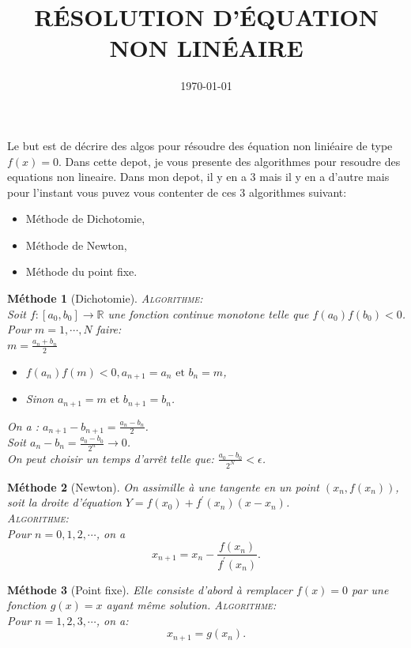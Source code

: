 \documentclass[a4paper,12pt]{article}
\date{\today}
\author{}
\title{RÉSOLUTION D'ÉQUATION NON LINÉAIRE}
\theoremstyle{break}
\newtheorem{meth}{Méthode}
\begin{document}
\maketitle

Le but est de décrire des algos pour résoudre des équation non liniéaire de type $f(x)=0$.
Dans cette depot, je vous presente des algorithmes pour resoudre des equations non lineaire.
Dans mon depot, il y en a 3 mais il y en a d'autre mais pour l'instant vous puvez vous contenter de ces 3 algorithmes suivant:
\begin{itemize}
    \item Méthode de Dichotomie,
    \item Méthode de Newton,
    \item Méthode du point fixe.
\end{itemize}

\begin{meth}[Dichotomie]
    \textsc{Algorithme:} \\
        Soit $f : [a_{0}, b_{0}] \rightarrow \mathbb{R}$ une fonction continue monotone telle que $f(a_{0})f(b_{0}) < 0$. \\
        Pour $m = 1, \cdots, N$ faire: \\ $m = \frac{a_{n} + b_{n}}{2}$
        \begin{itemize}
            \item $f(a_{n})f(m)<0, a_{n+1} = a_{n} \mbox{ et } b_{n} = m$,
            \item Sinon $a_{n+1} = m \mbox{ et } b_{n+1} = b_{n}$.
        \end{itemize}
        On a : $a_{n+1} - b_{n+1} = \frac{a_{n} - b_{n}}{2}$. \\
        Soit $a_{n} - b_{n} = \frac{a_{0} - b_{0}}{2^{n}} \rightarrow 0$. \\
        On peut choisir un temps d'arrêt telle que: $\frac{a_{0} - b_{0}}{2^{N}} < \epsilon$.
\end{meth}

\begin{meth}[Newton]
On assimille à une tangente en un point $(x_{n}, f(x_{n}))$, soit la droite d'équation $Y = f(x_{0}) + f^{'}(x_{n})(x - x_{n})$. \\
    \textsc{Algorithme:} \\
    Pour $n = 0,1,2, \cdots$, on a $$x_{n+1} = x_{n} - \frac{f(x_{n})}{f^{'}(x_{n})}.$$
\end{meth}

\begin{meth}[Point fixe]
    Elle consiste d'abord à remplacer $f(x)=0$ par une fonction $g(x)=x$ ayant même solution.
    \textsc{Algorithme:} \\
        Pour $n=1,2,3, \cdots$, on a: $$x_{n+1} = g(x_{n}).$$
\end{meth}
\end{document}
